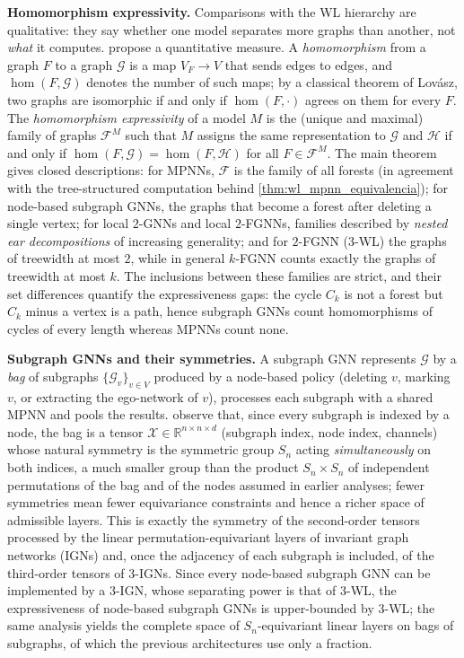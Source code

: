 \textbf{Homomorphism expressivity.} Comparisons with the WL hierarchy are qualitative: they say whether one model separates more graphs than another, not \textit{what} it computes. \citet{zhang2024beyondwl} propose a quantitative measure. A \textit{homomorphism} from a graph $F$ to a graph $\mathcal{G}$ is a map $V_F \to V$ that sends edges to edges, and $\hom(F, \mathcal{G})$ denotes the number of such maps; by a classical theorem of Lovász, two graphs are isomorphic if and only if $\hom(F, \cdot)$ agrees on them for every $F$. The \textit{homomorphism expressivity} of a model $M$ is the (unique and maximal) family of graphs $\mathcal{F}^M$ such that $M$ assigns the same representation to $\mathcal{G}$ and $\mathcal{H}$ if and only if $\hom(F, \mathcal{G}) = \hom(F, \mathcal{H})$ for all $F \in \mathcal{F}^M$. The main theorem gives closed descriptions: for \glspl{MPNN}, $\mathcal{F}$ is the family of all forests (in agreement with the tree-structured computation behind \autoref{thm:wl_mpnn_equivalencia}); for node-based subgraph \glspl{GNN}, the graphs that become a forest after deleting a single vertex; for local $2$-\glspl{GNN} and local $2$-FGNNs, families described by \textit{nested ear decompositions} of increasing generality; and for $2$-FGNN (3-WL) the graphs of treewidth at most $2$, while in general $k$-FGNN counts exactly the graphs of treewidth at most $k$. The inclusions between these families are strict, and their set differences quantify the expressiveness gaps: the cycle $C_k$ is not a forest but $C_k$ minus a vertex is a path, hence subgraph \glspl{GNN} count homomorphisms of cycles of every length whereas \glspl{MPNN} count none.

\textbf{Subgraph GNNs and their symmetries.} A subgraph \gls{GNN} represents $\mathcal{G}$ by a \textit{bag} of subgraphs $\{\mathcal{G}_v\}_{v \in V}$ produced by a node-based policy (deleting $v$, marking $v$, or extracting the ego-network of $v$), processes each subgraph with a shared \gls{MPNN} and pools the results. \citet{frasca2022subgraphsymmetries} observe that, since every subgraph is indexed by a node, the bag is a tensor $\mathcal{X} \in \mathbb{R}^{n \times n \times d}$ (subgraph index, node index, channels) whose natural symmetry is the symmetric group $S_n$ acting \textit{simultaneously} on both indices, a much smaller group than the product $S_n \times S_n$ of independent permutations of the bag and of the nodes assumed in earlier analyses; fewer symmetries mean fewer equivariance constraints and hence a richer space of admissible layers. This is exactly the symmetry of the second-order tensors processed by the linear permutation-equivariant layers of invariant graph networks (IGNs) and, once the adjacency of each subgraph is included, of the third-order tensors of $3$-IGNs. Since every node-based subgraph \gls{GNN} can be implemented by a $3$-IGN, whose separating power is that of $3$-WL, the expressiveness of node-based subgraph \glspl{GNN} is upper-bounded by $3$-WL; the same analysis yields the complete space of $S_n$-equivariant linear layers on bags of subgraphs, of which the previous architectures use only a fraction.

